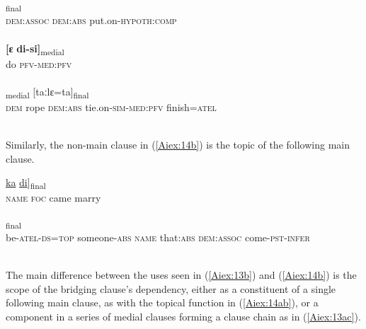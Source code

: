 \documentclass[output=paper]{LSP/langsci}
\begin{document}
\begin{exe}
\ex \label{Aiex:13ac}
\begin{xlist}
\ex \label{Aiex:13a}
\gll \underline{\smash{[aːmi}}	\underline{}	\underline{\smash{bɛː-ɸɛi]}}\textsubscript{final}\\
\textsc{dem:assoc}	\textsc{dem:abs}	put.on-\textsc{hypoth:comp}\\
\glt {}\\
\ex \label{Aiex:13b}
\gll \textbf{[ɛ}	\textbf{di-si]}\textsubscript{medial}\\
	do	\textsc{pfv-med:pfv}\\
\glt {}\\
\ex \label{Aiex:13c}
\textsubscript{medial}	[taːlɛ=ta]\textsubscript{final}\\
	\textsc{dem}	rope	\textsc{dem:abs}	tie.on-\textsc{sim-med:pfv}	finish=\textsc{atel}\\
\glt {}\\
\end{xlist}
\end{exe}

Similarly, the non-main clause in (\ref{Aiex:14b}) is the topic of the following main clause. 

\begin{exe}
\ex \label{Aiex:14ab}
\begin{xlist}
\ex \label{Aiex:14a}
\gll \underline{\smash{[usaja}}	\underline{ka}	\underline{}	\underline{di}]\textsubscript{final}\\
	\textsc{name}	\textsc{foc}	came	marry\\
\glt	{}\\
\ex \label{Aiex:14b}
\textsubscript{final}\\
	be-\textsc{atel-ds=top}	someone-\textsc{abs}	\textsc{name}	that\textsc{:abs}	\textsc{dem:assoc}	come\textsc{-pst-infer}\\
\glt {}\\
\end{xlist}
\end{exe}

The main difference between the uses seen in (\ref{Aiex:13b}) and (\ref{Aiex:14b}) is the scope of the bridging clause’s dependency, either as a constituent of a single following main clause, as with the topical function in (\ref{Aiex:14ab}), or a component in a series of medial clauses forming a clause chain as in (\ref{Aiex:13ac}).
\end{document}
